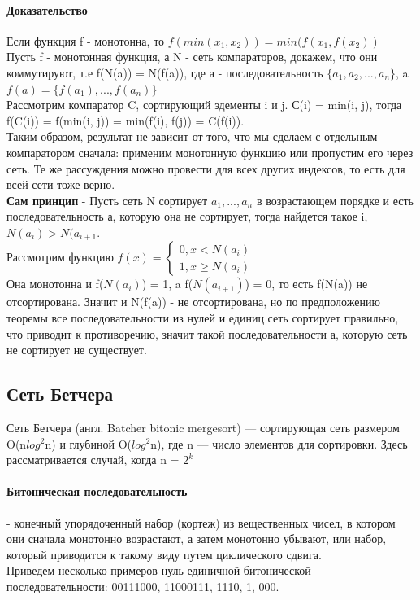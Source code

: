 \documentclass[a4paper,10pt]{article}
\begin{document}
\paragraph{Доказательство} Если функция f - монотонна, то $f(min(x_1, x_2)) = min(f(x_1, f(x_2))$\\
Пусть f - монотонная функция, а N - сеть компараторов, докажем, что они коммутируют, т.е f(N(a)) = N(f(a)), где а - последовательность $\{a_1, a_2, ..., a_n\}$, a $f(a)=\{f(a_1), ..., f(a_n)\}$\\
Рассмотрим компаратор C, сортирующий эдементы i и j. С(i) = min(i, j), тогда f(C(i)) = f(min(i, j)) = min(f(i), f(j)) = C(f(i)).\\
Таким образом, результат не зависит от того, что мы сделаем с отдельным компаратором сначала: применим монотонную функцию или пропустим его через сеть. Те же рассуждения можно провести для всех других индексов, то есть для всей сети тоже верно.\\
\textbf{Сам принцип} - Пусть сеть N сортирует $a_1, ..., a_n$ в возрастающем порядке и есть последовательность а, которую она не сортирует, тогда найдется такое i, $N(a_i) > N(a_{i+1}$.\\
Рассмотрим функцию $f(x) = \begin{cases} 0, x < N(a_i) \\ 1, x \geq N(a_i) \end{cases}$\\
Она монотонна и f($N(a_i)$) = 1, a  f($N(a_{i+1})$) = 0, то есть f(N(a)) не отсортирована. Значит и N(f(a)) - не отсортирована, но по предположению теоремы все последовательности из нулей и единиц сеть сортирует правильно, что приводит к противоречию, значит такой последовательности а, которую сеть не сортирует не существует.\\
\subsection{Сеть Бетчера}
Сеть Бетчера (англ. Batcher bitonic mergesort) — сортирующая сеть размером O(n$log^2$n) и глубиной O($log^2$n), где n — число элементов для сортировки. Здесь рассматривается случай, когда n = $2^k$\\
\paragraph{Битоническая последовательность} - конечный упорядоченный набор (кортеж) из вещественных чисел, в котором они сначала монотонно возрастают, а затем монотонно убывают, или набор, который приводится к такому виду путем циклического сдвига.\\
Приведем несколько примеров нуль-единичной битонической последовательности: 00111000, 11000111, 1110, 1, 000.
\end{document}
